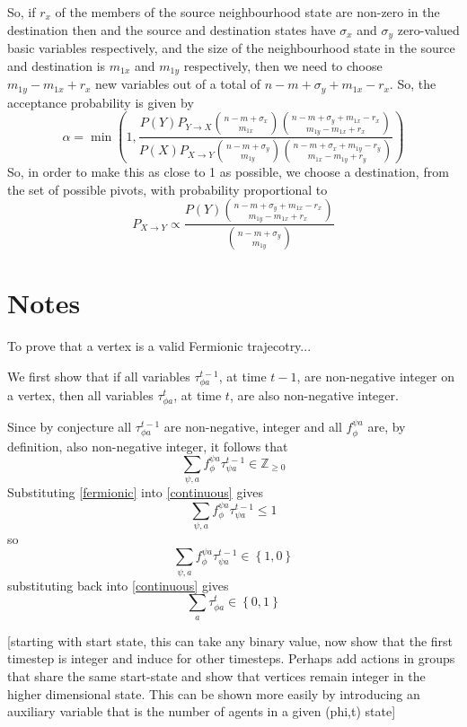 \documentclass{article}
\begin{document}
 So, if $r_x$ of the members of the source neighbourhood state are non-zero in the destination then and the source and destination states have $\sigma_x$ and $\sigma_y$ zero-valued basic variables respectively, and the size of the neighbourhood state in the source and destination is $m_{1x}$ and $m_{1y}$ respectively, then we need to choose $m_{1y} - m_{1x} +r_x$ new variables out of a total of $n-m+\sigma_y+m_{1x}-r_x$.
So, the acceptance probability is given by
\[
\alpha = \min\left(1,
\frac{P(Y) P_{Y \rightarrow X}\left.n-m+\sigma_x\choose m_{1x}\right. \left.n-m+\sigma_y + m_{1x} - r_x\choose m_{1y} - m_{1x} + r_x\right. }
{P(X) P_{X \rightarrow Y}\left.n-m+\sigma_y\choose m_{1y}\right. \left.n-m+\sigma_x + m_{1y} - r_y\choose m_{1x} - m_{1y} + r_y\right.}\right)
\]
So, in order to make this as close to 1 as possible, we choose a destination, from the set of possible pivots, with probability proportional to
\[
P_{X \rightarrow Y} \propto \frac{P(Y)\left.n-m+\sigma_y + m_{1x} - r_x\choose m_{1y} - m_{1x} + r_x\right.}{\left.n-m+\sigma_y\choose m_{1y}\right.}
\]


\section{Notes}

To prove that a vertex is a valid Fermionic trajecotry... 

We first show that if all variables $\tau^{t-1}_{\phi a}$, at time $t-1$, are non-negative integer on a vertex, then all variables $\tau^t_{\phi a}$, at time $t$, are also non-negative integer.

Since by conjecture all $\tau^{t-1}_{\phi a}$ are non-negative, integer and all $f^{\psi a}_\phi$ are, by definition, also non-negative integer, it follows that
\[
\sum_{\psi, a} f_\phi^{\psi a}\tau^{t-1}_{\psi a} \in \mathbb{Z}_{\ge 0}
\]
Substituting \ref{fermionic} into \ref{continuous} gives
\[
\sum_{\psi, a} f_\phi^{\psi a}\tau^{t-1}_{\psi a} \le 1
\]
so 
\[
\sum_{\psi, a} f_\phi^{\psi a}\tau^{t-1}_{\psi a} \in \left\{1,0\right\}
\]
substituting back into \ref{continuous} gives
\[
\sum_a \tau^t_{\phi a} \in \left\{0,1\right\}
\]

[starting with start state, this can take any binary value, now show that the first timestep is integer and induce for other timesteps. Perhaps add actions in groups that share the same start-state and show that vertices remain integer in the higher dimensional state. This can be shown more easily by introducing an auxiliary variable that is the number of agents in a given (phi,t) state]
\end{document}
